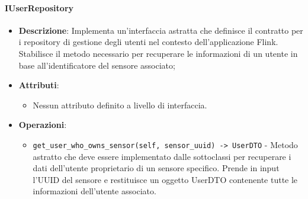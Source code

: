 \documentclass[10pt]{article}
\begin{document}
    \paragraph{IUserRepository}
    \begin{itemize} 
    \item \textbf{Descrizione}: Implementa un'interfaccia astratta che definisce il contratto per i repository di gestione degli utenti nel contesto dell'applicazione Flink. Stabilisce il metodo necessario per recuperare le informazioni di un utente in base all'identificatore del sensore associato;
    \item \textbf{Attributi}:
    \begin{itemize}
        \item Nessun attributo definito a livello di interfaccia.
    \end{itemize}
    
    \item \textbf{Operazioni}:
    \begin{itemize}
        \item \texttt{get\_user\_who\_owns\_sensor(self, sensor\_uuid) -> UserDTO} - Metodo astratto che deve essere implementato dalle sottoclassi per recuperare i dati dell'utente proprietario di un sensore specifico. Prende in input l'UUID del sensore e restituisce un oggetto UserDTO contenente tutte le informazioni dell'utente associato.
    \end{itemize}
    \end{itemize}
\end{document}
